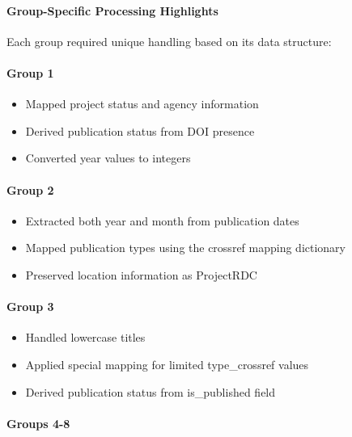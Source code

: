 \documentclass[12pt]{article}
\providecommand{\tightlist}{%
  \setlength{\itemsep}{0pt}\setlength{\parskip}{0pt}}
\begin{document}
\paragraph{Group-Specific Processing
Highlights}\label{group-specific-processing-highlights}

Each group required unique handling based on its data structure:

\paragraph{Group 1}\label{group-1}

\begin{itemize}
\tightlist
\item
  Mapped project status and agency information
\item
  Derived publication status from DOI presence
\item
  Converted year values to integers
\end{itemize}

\paragraph{Group 2}\label{group-2}

\begin{itemize}
\tightlist
\item
  Extracted both year and month from publication dates
\item
  Mapped publication types using the crossref mapping dictionary
\item
  Preserved location information as ProjectRDC
\end{itemize}

\paragraph{Group 3}\label{group-3}

\begin{itemize}
\tightlist
\item
  Handled lowercase titles
\item
  Applied special mapping for limited type\_crossref values
\item
  Derived publication status from is\_published field
\end{itemize}

\paragraph{Groups 4-8}\label{groups-4-8}
\end{document}
